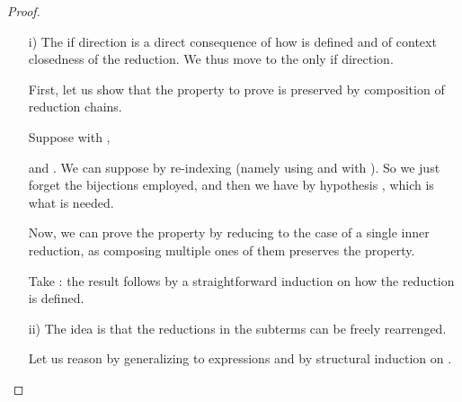 \begin{proof}\
\begin{itemize}
\item[i)] The if direction is a direct consequence of how  is
  defined and of context closedness of the reduction. We thus move to
  the only if direction.

  First, let us show that the property to prove is preserved by
  composition of reduction chains.

  Suppose
   with ,
  
  and . We can suppose
   by re-indexing (namely using
   and
   with
  ). So we just
  forget the bijections employed, and then we have by hypothesis
  , which is what is
  needed.

  Now, we can prove the property by reducing to the case of a single
  inner reduction, as composing multiple ones of them preserves the
  property.

  Take : the result follows by a straightforward
  induction on how the reduction is defined.

\item[ii)] The idea is that the reductions in the subterms can be freely
  rearrenged.

  Let us reason by generalizing to expressions and by structural
  induction on .
 \end{itemize}
\end{proof}
